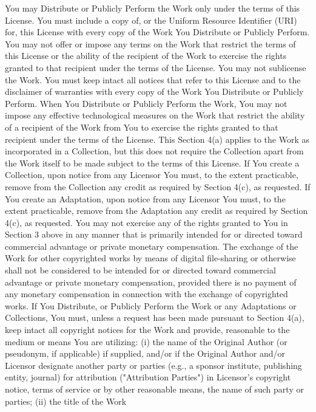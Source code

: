 \documentclass[oneside]{book}
\begin{document}
You may Distribute or Publicly Perform the Work only under the terms of this
License. You must include a copy of, or the Uniform Resource Identifier (URI)
for, this License with every copy of the Work You Distribute or Publicly
Perform. You may not offer or impose any terms on the Work that restrict the
terms of this License or the ability of the recipient of the Work to exercise
the rights granted to that recipient under the terms of the License. You may not
sublicense the Work. You must keep intact all notices that refer to this License
and to the disclaimer of warranties with every copy of the Work You Distribute
or Publicly Perform. When You Distribute or Publicly Perform the Work, You may
not impose any effective technological measures on the Work that restrict the
ability of a recipient of the Work from You to exercise the rights granted to
that recipient under the terms of the License. This Section 4(a) applies to the
Work as incorporated in a Collection, but this does not require the Collection
apart from the Work itself to be made subject to the terms of this License. If
You create a Collection, upon notice from any Licensor You must, to the extent
practicable, remove from the Collection any credit as required by Section 4(c),
as requested. If You create an Adaptation, upon notice from any Licensor You
must, to the extent practicable, remove from the Adaptation any credit as
required by Section 4(c), as requested.  You may not exercise any of the rights
granted to You in Section 3 above in any manner that is primarily intended for
or directed toward commercial advantage or private monetary compensation. The
exchange of the Work for other copyrighted works by means of digital
file-sharing or otherwise shall not be considered to be intended for or directed
toward commercial advantage or private monetary compensation, provided there is
no payment of any monetary compensation in connection with the exchange of
copyrighted works.  If You Distribute, or Publicly Perform the Work or any
Adaptations or Collections, You must, unless a request has been made pursuant to
Section 4(a), keep intact all copyright notices for the Work and provide,
reasonable to the medium or means You are utilizing: (i) the name of the
Original Author (or pseudonym, if applicable) if supplied, and/or if the
Original Author and/or Licensor designate another party or parties (e.g., a
sponsor institute, publishing entity, journal) for attribution ("Attribution
Parties") in Licensor's copyright notice, terms of service or by other
reasonable means, the name of such party or parties; (ii) the title of the Work
\end{document}
